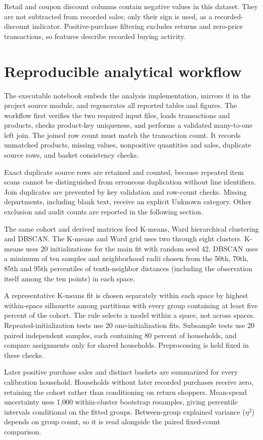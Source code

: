 Retail and coupon discount columns contain negative values in this dataset. They are not subtracted from recorded sales; only their sign is used, as a recorded-discount indicator. Positive-purchase filtering excludes returns and zero-price transactions, so features describe recorded buying activity.

\section{Reproducible analytical workflow}
The executable notebook embeds the analysis implementation, mirrors it in the project source module, and regenerates all reported tables and figures. The workflow first verifies the two required input files, loads transactions and products, checks product-key uniqueness, and performs a validated many-to-one left join. The joined row count must match the transaction count. It records unmatched products, missing values, nonpositive quantities and sales, duplicate source rows, and basket consistency checks.

Exact duplicate source rows are retained and counted, because repeated item scans cannot be distinguished from erroneous duplication without line identifiers. Join duplicates are prevented by key validation and row-count checks. Missing departments, including blank text, receive an explicit Unknown category. Other exclusion and audit counts are reported in the following section.

The same cohort and derived matrices feed K-means, Ward hierarchical clustering and DBSCAN. The K-means and Ward grid uses two through eight clusters. K-means uses 20 initializations for the main fit with random seed 42. DBSCAN uses a minimum of ten samples and neighborhood radii chosen from the 50th, 70th, 85th and 95th percentiles of tenth-neighbor distances (including the observation itself among the ten points) in each space.

A representative K-means fit is chosen separately within each space by highest within-space silhouette among partitions with every group containing at least five percent of the cohort. The rule selects a model within a space, not across spaces. Repeated-initialization tests use 20 one-initialization fits. Subsample tests use 20 paired independent samples, each containing 80 percent of households, and compare assignments only for shared households. Preprocessing is held fixed in these checks.

Later positive purchase sales and distinct baskets are summarized for every calibration household. Households without later recorded purchases receive zero, retaining the cohort rather than conditioning on return shoppers. Mean-spend uncertainty uses 1,000 within-cluster bootstrap resamples, giving percentile intervals conditional on the fitted groups. Between-group explained variance ($\eta^2$) depends on group count, so it is read alongside the paired fixed-count comparison.
